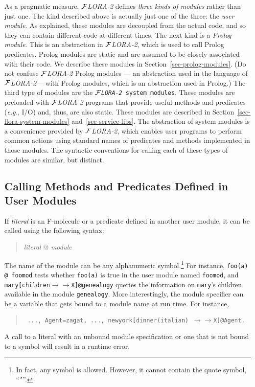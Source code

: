 \documentclass[11pt]{article}
\newcommand{\mvd}{\ensuremath{{\rightarrow\!\!\!\!\rightarrow}}}  %
\newcommand{\FLORA}{{\mbox{${\cal F}${\small\it LORA}\rm\emph{-2}}}\xspace}
\begin{document}
As a pragmatic measure, \FLORA defines \emph{three kinds of modules} rather
than just one. The kind described above is actually just one of the three:
the \emph{user module}. As explained, these modules are decoupled from the
actual code, and so they can contain different code at different times.
The next kind is a \emph{Prolog module}. This is an abstraction in \FLORA,
which is used to call Prolog predicates. Prolog modules are static and are
assumed to be closely associated with their code. We describe these modules
in Section~\ref{sec-prolog-modules}. (Do not confuse \FLORA Prolog modules
--- an abstraction used in the language of \FLORA --- with Prolog modules,
which is an abstraction used in Prolog.)  The third type of modules are the
{\tt \FLORA system modules}. These modules are preloaded with \FLORA
programs that provide useful methods and predicates ({\it e.g.}, I/O) and,
thus, are also static. These modules are described in
Section~\ref{sec-flora-system-modules} and~\ref{sec-service-libs}. The
abstraction of system modules is a convenience provided by \FLORA, which
enables user programs to perform common actions using standard names of
predicates and methods implemented in those modules. The syntactic
conventions for calling each of these types of modules are similar, but
distinct.


\subsection{Calling Methods and Predicates Defined in User Modules}


%
If \emph{literal} is an F-molecule or a predicate defined in another
user module, it can be called using the following syntax:
\begin{quote}
\emph{literal} @ \emph{module} 
\end{quote}
The name of the module can be any alphanumeric symbol.\footnote{
  In fact, any symbol is allowed. However, it cannot contain the quote
  symbol, ``{\tt '}''.
  }
For instance, \verb|foo(a) @ foomod| tests whether {\tt foo(a)} is true in
the user module named {\tt foomod}, and {\tt mary[children\mvd X]@genealogy}
queries the information on {\tt mary}'s children available in the module
{\tt genealogy}. More interestingly, the module specifier can be a variable
that gets bound to a module name at run time. For instance, 
\begin{quote}
 {\tt
   ..., Agent=zagat, ..., newyork[dinner(italian) \mvd X]@Agent.
   }
\end{quote}
A call to a literal with an unbound module specification or one that is not
bound to a symbol will result in a runtime error.
\end{document}
